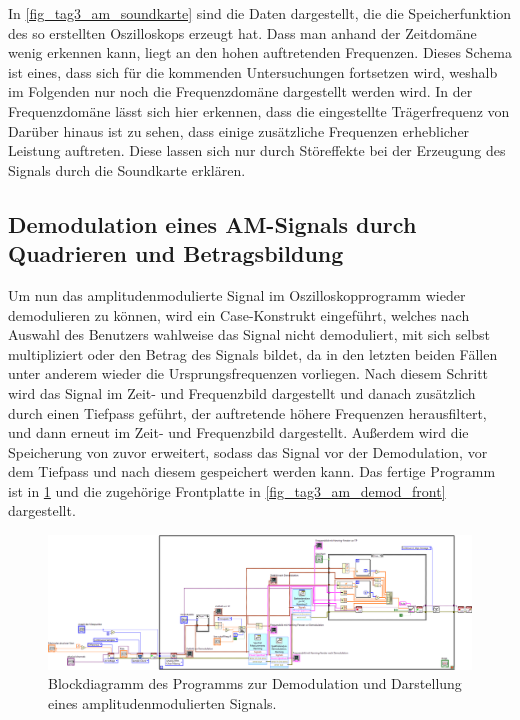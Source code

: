 \documentclass[
a4paper,
12pt,
pagesize,
ngerman
]{scrartcl}
\begin{document}
	In \cref{fig_tag3_am_soundkarte} sind die Daten dargestellt, die die Speicherfunktion des so erstellten Oszilloskops erzeugt hat.
	Dass man anhand der Zeitdomäne wenig erkennen kann, liegt an den hohen auftretenden Frequenzen.
	Dieses Schema ist eines, dass sich für die kommenden Untersuchungen fortsetzen wird, weshalb im Folgenden nur noch die Frequenzdomäne dargestellt werden wird.
	In der Frequenzdomäne lässt sich hier erkennen, dass die eingestellte Trägerfrequenz von %
	Darüber hinaus ist zu sehen, dass einige zusätzliche Frequenzen erheblicher Leistung auftreten.
	Diese lassen sich nur durch Störeffekte bei der Erzeugung des Signals durch die Soundkarte erklären. %
	

	\subsection{Demodulation eines AM-Signals durch Quadrieren und Betragsbildung} \label{DemodulationAM}
	Um nun das amplitudenmodulierte Signal im Oszilloskopprogramm wieder demodulieren zu können, wird ein Case-Konstrukt eingeführt, welches nach Auswahl des Benutzers wahlweise das Signal nicht demoduliert, mit sich selbst multipliziert oder den Betrag des Signals bildet, da in den letzten beiden Fällen unter anderem wieder die Ursprungsfrequenzen vorliegen.
	Nach diesem Schritt wird das Signal im Zeit- und Frequenzbild dargestellt und danach zusätzlich durch einen Tiefpass geführt, der auftretende höhere Frequenzen herausfiltert, und dann erneut im Zeit- und Frequenzbild dargestellt.
	Außerdem wird die Speicherung von zuvor erweitert, sodass das Signal vor der Demodulation, vor dem Tiefpass und nach diesem gespeichert werden kann.
	Das fertige Programm ist in \cref{fig_tag3_am_demod_block} und die zugehörige Frontplatte in \cref{fig_tag3_am_demod_front} dargestellt.

	\begin{figure}[H]  
		\includegraphics[width=1\textwidth]{EIRE2018Dateien/Tag3/modifizierterOszi/Oszilloskop__modifiziertd}
		\centering
		\caption{
			Blockdiagramm des Programms zur Demodulation und Darstellung eines amplitudenmodulierten Signals.
		}
		\label{fig_tag3_am_demod_block}
		\centering
	\end{figure}
\end{document}
